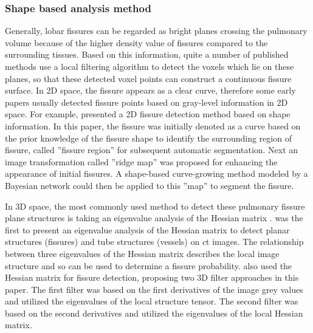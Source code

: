 \subsubsection{Shape based analysis method}
Generally, lobar fissures can be regarded as bright planes crossing the pulmonary volume because of the higher density value of fissures compared to the surrounding tissues. Based on this information, quite a number of published methods use a local filtering algorithm to detect the voxels which lie on these planes, so that these detected voxel points can construct a continuous fissure surface. In 2D space, the fissure appears as a clear curve, therefore some early papers usually detected fissure points based on gray-level information in 2D space. For example, \cite{wang2004shape,wang2006pulmonary} presented a 2D fissure detection method based on shape information. In this paper, the fissure was initially denoted as a curve based on the prior knowledge of the fissure shape to identify the surrounding region of fissure, called ''fissure region'' for subsequent automatic segmentation. Next an image transformation called ''ridge map'' was proposed for enhancing the appearance of initial fissures. A shape-based curve-growing method modeled by a Bayesian network could then be applied to this ''map'' to segment the fissure.

In 3D space, the most commonly used method to detect these pulmonary fissure plane structures is taking an eigenvalue analysis of the Hessian matrix \citep{frangi1998multiscale,wiemker2005unsupervised,kitasaka2006recognition,ochs2007automated,van2008supervised,lassen2011interactive,lassen2013automatic,ross2010automatic,doel2012pulmonary}. \cite{frangi1998multiscale} was the first to present an eigenvalue analysis of the Hessian matrix to detect planar structures (fissures) and tube structures (vessels) on \gls{ct} images. The relationship between three eigenvalues of the Hessian matrix describes the local image structure and so can be used to determine a fissure probability. \cite{wiemker2005unsupervised} also used the Hessian matrix for fissure detection, proposing two 3D filter approaches in this paper. The first filter was based on the first derivatives of the image grey values and utilized the eigenvalues of the local structure tensor. The second filter was based on the second derivatives and utilized the eigenvalues of the local Hessian matrix. 

